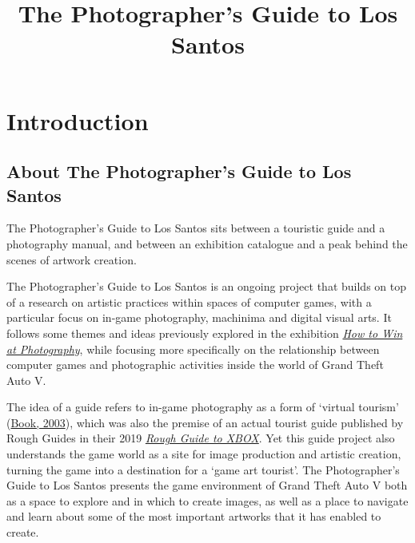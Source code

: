 \documentclass[
  openany]{book}
\title{The Photographer's Guide to Los Santos}
\author{}
\date{\vspace{-2.5em}}
\begin{document}
\maketitle

{
\setcounter{tocdepth}{1}
\tableofcontents
}
\hypertarget{introduction}{%
\chapter{Introduction}\label{introduction}}

\hypertarget{about-the-photographers-guide-to-los-santos}{%
\section*{About The Photographer's Guide to Los Santos}\label{about-the-photographers-guide-to-los-santos}}

The Photographer's Guide to Los Santos sits between a touristic guide and a photography manual, and between an exhibition catalogue and a peak behind the scenes of artwork creation.

The Photographer's Guide to Los Santos is an ongoing project that builds on top of a research on artistic practices within spaces of computer games, with a particular focus on in-game photography, machinima and digital visual arts. It follows some themes and ideas previously explored in the exhibition \href{https://www.howtowinat.photography/}{\emph{How to Win at Photography}}, while focusing more specifically on the relationship between computer games and photographic activities inside the world of Grand Theft Auto V.

The idea of a guide refers to in-game photography as a form of `virtual tourism' (\href{https://papers.ssrn.com/sol3/papers.cfm?abstract_id=538182}{Book, 2003}), which was also the premise of an actual tourist guide published by Rough Guides in their 2019 \href{https://www.roughguides.com/articles/introduction-to-the-rough-guide-to-xbox/}{\emph{Rough Guide to XBOX}}. Yet this guide project also understands the game world as a site for image production and artistic creation, turning the game into a destination for a `game art tourist'. The Photographer's Guide to Los Santos presents the game environment of Grand Theft Auto V both as a space to explore and in which to create images, as well as a place to navigate and learn about some of the most important artworks that it has enabled to create.
\end{document}

